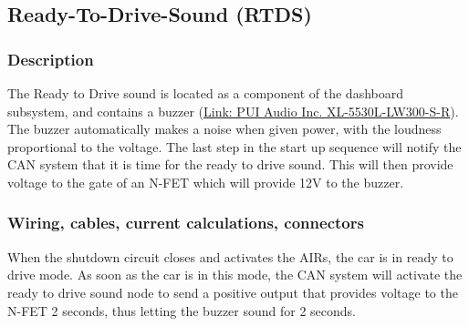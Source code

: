 \documentclass{article}
\begin{document}
\subsection{Ready-To-Drive-Sound (RTDS)}
\subsubsection{Description}
The Ready to Drive sound is located as a component of the dashboard subsystem, and contains a buzzer (\href{http://www.puiaudio.com/pdf/XL-5530L-LW300-S-R.pdf}{Link: PUI Audio Inc. XL-5530L-LW300-S-R}). The buzzer automatically makes a noise when given power, with the loudness proportional
to the voltage. The last step in the start up sequence will notify the CAN system that it is time for the ready
to drive sound. This will then provide voltage to the gate of an N-FET which will provide 12V to the buzzer.
\subsubsection{Wiring, cables, current calculations, connectors}
When the shutdown circuit closes and activates the AIRs, the car is in ready to drive mode. As soon as the
car is in this mode, the CAN system will activate the ready to drive sound node to send a positive output
that provides voltage to the N-FET 2 seconds, thus letting the buzzer sound for 2 seconds. 
\end{document}

